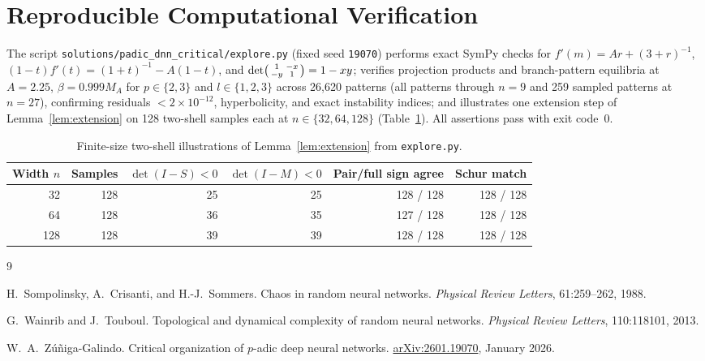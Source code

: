 \documentclass[11pt]{article}
\theoremstyle{plain}
\theoremstyle{definition}
\theoremstyle{remark}
\begin{document}
\section{Reproducible Computational Verification}

The script \texttt{solutions/padic\_dnn\_critical/explore.py} (fixed seed \texttt{19070}) performs exact SymPy checks for $f'(m) = Ar + (3 + r)^{-1}$, $(1 - t)f'(t) = (1 + t)^{-1} - A(1 - t)$, and $\det\begin{psmallmatrix} 1 & -x \\ -y & 1 \end{psmallmatrix} = 1 - xy$; verifies projection products and branch-pattern equilibria at $A = 2.25$, $\beta = 0.999 M_A$ for $p \in \{2, 3\}$ and $l \in \{1, 2, 3\}$ across 26{,}620 patterns (all patterns through $n = 9$ and 259 sampled patterns at $n = 27$), confirming residuals $< 2 \times 10^{-12}$, hyperbolicity, and exact instability indices; and illustrates one extension step of Lemma~\ref{lem:extension} on 128 two-shell samples each at $n \in \{32, 64, 128\}$ (Table~\ref{tab:shells}). All assertions pass with exit code~$0$.

\begin{table}[ht]
\centering
\begin{tabular}{@{}rrrrrr@{}}
\toprule
Width $n$ & Samples & $\det(I - S) < 0$ & $\det(I - M) < 0$ & Pair/full sign agree & Schur match \\
\midrule
32  & 128 & 25 & 25 & 128 / 128 & 128 / 128 \\
64  & 128 & 36 & 35 & 127 / 128 & 128 / 128 \\
128 & 128 & 39 & 39 & 128 / 128 & 128 / 128 \\
\bottomrule
\end{tabular}
\caption{Finite-size two-shell illustrations of Lemma~\ref{lem:extension} from \texttt{explore.py}.}\label{tab:shells}
\end{table}

\begin{thebibliography}{9}

H.~Sompolinsky, A.~Crisanti, and H.-J.~Sommers.
Chaos in random neural networks.
\emph{Physical Review Letters}, 61:259--262, 1988.

G.~Wainrib and J.~Touboul.
Topological and dynamical complexity of random neural networks.
\emph{Physical Review Letters}, 110:118101, 2013.

W.~A.~Z\'u\~niga-Galindo.
Critical organization of $p$-adic deep neural networks.
\href{https://arxiv.org/abs/2601.19070}{arXiv:2601.19070}, January 2026.

\end{thebibliography}
\end{document}
